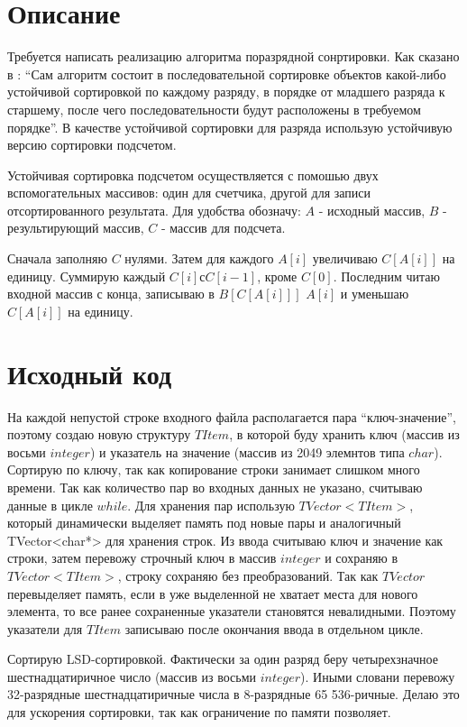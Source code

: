 \section{Описание}
Требуется написать реализацию алгоритма поразрядной сонртировки. 
Как сказано в \cite{Kormen}: \enquote{Сам алгоритм состоит в последовательной сортировке объектов какой-либо устойчивой сортировкой по каждому разряду, в порядке от младшего разряда к старшему, после чего последовательности будут расположены в требуемом порядке}. В качестве устойчивой сортировки для разряда использую устойчивую версию сортировки подсчетом\cite{wikipedia_sort}. 

Устойчивая сортировка подсчетом осуществляется с помошью двух вспомогательных массивов: один для счетчика, другой для записи отсортированного результата. Для удобства обозначу: $A$ - исходный массив, $B$ - результирующий массив, $C$ - массив для подсчета. 

Сначала заполняю $C$ нулями. Затем для каждого $A[i]$ увеличиваю $C[A[i]]$ на единицу. Суммирую каждый $C[i] с C[i - 1]$, кроме $C[0]$. Последним читаю входной массив с конца, записываю в $B[C[A[i]]]$ $A[i]$ и уменьшаю $C[A[i]]$ на единицу\cite{wikipedia_sort}.

\pagebreak

\section{Исходный код}
На каждой непустой строке входного файла располагается пара \enquote{ключ-значение}, поэтому создаю новую 
структуру $TItem$, в которой буду хранить ключ (массив из восьми $integer$) и указатель на значение (массив из 2049 элемнтов типа $char$).  Сортирую по ключу, так как копирование строки занимает слишком много времени. Так как количество пар во входных данных не указано, считываю данные в цикле $while$. Для хранения пар использую $TVector<TItem>$, который динамически выделяет память под новые пары и аналогичный TVector<char*> для хранения строк. Из ввода считываю ключ и значение как строки, затем перевожу строчный ключ в массив $integer$ и сохраняю в $TVector<TItem>$, строку сохраняю без преобразований. Так как $TVector$ перевыделяет память, если в уже выделенной не хватает места для нового элемента, то все ранее сохраненные указатели становятся невалидными. Поэтому указатели для  $TItem$ записываю после окончания ввода в отдельном цикле.

Сортирую LSD-сортировкой. Фактически за один разряд беру четырехзначное шестнадцатиричное число (массив из восьми $integer$). Иными словани перевожу 32-разрядные шестнадцатиричные числа в 8-разрядные 65 536-ричные. Делаю это для ускорения сортировки, так как ограничение по памяти позволяет. 

